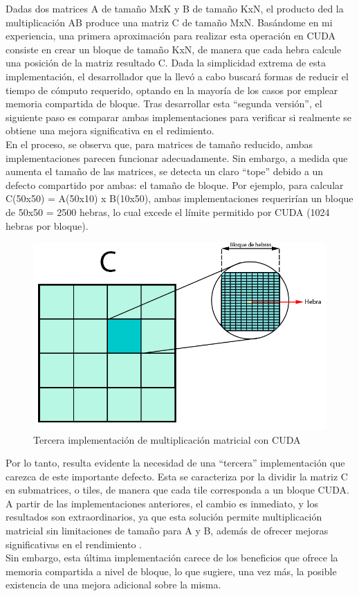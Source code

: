 Dadas dos matrices A de tamaño MxK y B de tamaño KxN, el producto ded la multiplicación AB produce una matriz C de tamaño MxN. Basándome en mi experiencia, una primera aproximación para realizar esta operación en CUDA consiste en crear un bloque de tamaño KxN, de manera que cada hebra calcule una posición de la matriz resultado C. Dada la simplicidad extrema de esta implementación, el desarrollador que la llevó a cabo buscará formas de reducir el tiempo de cómputo requerido, optando en la mayoría de los casos por emplear memoria compartida de bloque. Tras desarrollar esta ``segunda versión'', el siguiente paso es comparar ambas implementaciones para verificar si realmente se obtiene una mejora significativa en el redimiento. \\
En el proceso, se observa que, para matrices de tamaño reducido, ambas implementaciones parecen funcionar adecuadamente. Sin embargo, a medida que aumenta el tamaño de las matrices, se detecta un claro ``tope'' debido a un defecto compartido por ambas: el tamaño de bloque. Por ejemplo, para calcular C(50x50) = A(50x10) x B(10x50), ambas implementaciones requerirían un bloque de 50x50 = 2500 hebras, lo cual excede el límite permitido por CUDA (1024 hebras por bloque). \\

\begin{figure}[H]
	\centering
	\includegraphics[scale=0.3]{imagenes/gemm_tile_v3.jpg}  
	\caption{Tercera implementación de multiplicación matricial con CUDA}
	\label{fig:mult_matrix_cuda_v3}
\end{figure}

Por lo tanto, resulta evidente la necesidad de una ``tercera'' implementación que carezca de este importante defecto. Esta se caracteriza por la dividir la matriz C en submatrices, o tiles, de manera que cada tile corresponda a un bloque CUDA. A partir de las implementaciones anteriores, el cambio es inmediato, y los resultados son extraordinarios, ya que esta solución permite multiplicación matricial sin limitaciones de tamaño para A y B, además de ofrecer mejoras significativas en el rendimiento \cite{cuda_mult_matrix_v3}. \\
Sin embargo, esta última implementación carece de los beneficios que ofrece la memoria compartida a nivel de bloque, lo que sugiere, una vez más, la posible existencia de una mejora adicional sobre la misma. \\

